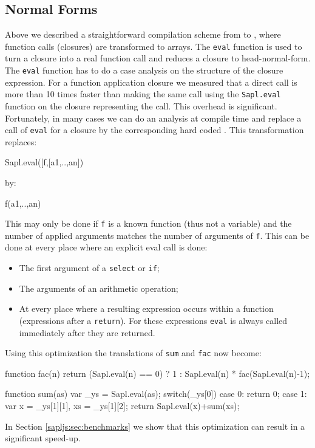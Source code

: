 \subsection{Normal Forms}
Above we described a straightforward compilation scheme from \Sapl to \JS, 
where function calls (closures) are transformed to arrays.
The \texttt{eval} function is used to turn a closure into a real \JS function call and reduces a closure to head-normal-form.
The \texttt{eval} function has to do a case analysis on the structure of the closure expression.
For a function application closure we measured that a direct \JS call is more than 10 times faster 
than making the same call using the 
\texttt{Sapl.eval} function on the closure representing the call. This overhead is significant. 
Fortunately, in many cases we can do an analysis at compile time and replace a call of \texttt{eval} for a closure by the corresponding hard coded \JS.
This transformation replaces:
\begin{CleanCode}
Sapl.eval([f,[a1,..,an])
\end{CleanCode}
by:
\begin{CleanCode}
f(a1,..,an)
\end{CleanCode}
This may only be done if \texttt{f} is a known function (thus not a variable) and the number of applied arguments matches the
number of arguments of \texttt{f}.
This can be done at every place where an explicit \textsf{eval} call is done:
\begin{itemize}
\item The first argument of a \texttt{select} or \texttt{if};
\item The arguments of an arithmetic operation;
\item At every place where a resulting expression occurs within a \JS function (expressions after a \texttt{return}).
For these expressions  \texttt{eval} is always called immediately after they are returned.
\end{itemize}
Using this optimization the translations of \texttt{sum} and \texttt{fac} now become:
\begin{CleanCode}
function fac(n){
	return (Sapl.eval(n) == 0) ? 1 : Sapl.eval(n) * fac(Sapl.eval(n)-1);
}

function sum(as){
	var _ys = Sapl.eval(as);
	switch(_ys[0]){
		case 0: return 0;
		case 1: var x = _ys[1][1], xs = _ys[1][2]; 
		        return Sapl.eval(x)+sum(xs);
	}
}
\end{CleanCode}
In Section \ref{sapljs:sec:benchmarks} we show that this optimization can result in 
a significant speed-up.


